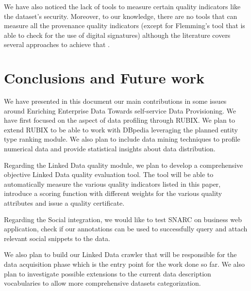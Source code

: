 \documentclass[onecolumn, crcready]{iosart2c}
\begin{document}
We have also noticed the lack of tools to measure certain quality indicators like the dataset's security. Moreover, to our knowledge, there are no tools that can measure all the provenance quality indicators (except for Flemming's tool that is able to check for the use of digital signatures) although the literature covers several approaches to achieve that \cite{Hartig09usingweb}\cite{Flouris2012}\cite{Harth2009}.


\section{Conclusions and Future work}

We have presented in this document our main contributions in some issues around Enriching Enterprise Data Towards self-service Data Provisioning. We have first focused on the aspect of data profiling through RUBIX. We plan to extend RUBIX to be able to work with DBpedia leveraging the planned entity type ranking module. We also plan to include data mining techniques to profile numerical data and provide statistical insights about data distribution.

Regarding the Linked Data quality module, we plan to develop a comprehensive objective Linked Data quality evaluation tool. The tool will be able to automatically measure the various quality indicators listed in this paper, introduce a scoring function with different weights for the various quality attributes and issue a quality certificate.

Regarding the Social integration, we would like to test SNARC on business web application, check if our annotations can be used to successfully query and attach relevant social snippets to the data.

We also plan to build our Linked Data crawler that will be responsible for the data acquisition phase which is the entry point for the work done so far. We also plan to investigate possible extensions to the current data description vocabularies to allow more comprehensive datasets categorization.


\nocite{*}


\end{document}
